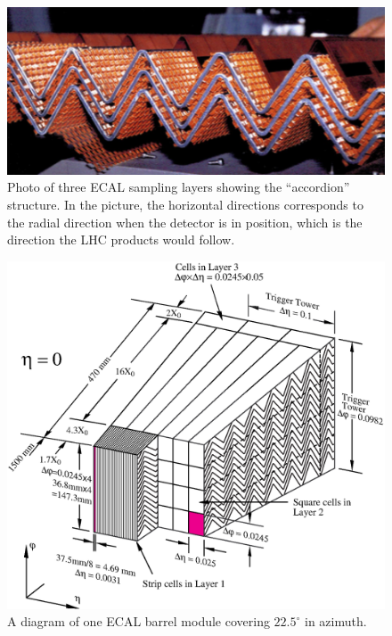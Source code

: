 \begin{figure}[ht]
\centering
\includegraphics[width=.7\textwidth]{figures/atlas/emcal_accordion.png}
\caption{Photo of three ECAL sampling layers
showing the ``accordion'' structure. In the picture, 
the horizontal directions corresponds to 
the radial direction when the detector is in position, which is
the direction the LHC products would follow.}
\label{fig:atlas_emcal_accordion}
\end{figure}

\begin{figure}[ht]
\centering
\includegraphics[width=.8\textwidth]{figures/atlas/emcal_barrel_module.eps}
\caption{ A diagram of one ECAL barrel module 
covering $22.5^{\circ}$ in azimuth.}
\label{fig:atlas_emcal_module}
\end{figure}

